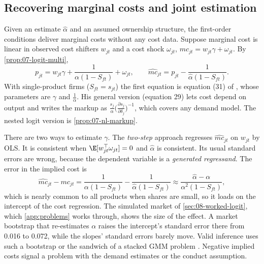\subsection{Recovering marginal costs and joint estimation}\label{sec:07-cost-recovery}

Given an estimate $\hat\alpha$ and an assumed ownership structure, the first-order conditions deliver marginal costs
without any cost data. Suppose marginal cost is linear in observed cost shifters $w_{jt}$ and a cost shock
$\omega_{jt}$, $mc_{jt} = w_{jt}\gamma + \omega_{jt}$. By \cref{prop:07-logit-multi},
\begin{equation}\label{eq:07-logit-supply}
  p_{jt} = w_{jt}\gamma + \frac{1}{\alpha(1 - S_{ft})} + \omega_{jt},
  \qquad \widehat{mc}_{jt} = p_{jt} - \frac{1}{\hat\alpha(1 - S_{ft})} .
\end{equation}
With single-product firms ($S_{ft} = s_{jt}$) the first equation is equation (31) of \citet[p.~255]{Berry1994},
whose parameters are $\gamma$ and $\frac{1}{\alpha}$. His general version (equation 29) lets cost depend on output and
writes the markup as $\frac{s_j}{\alpha}\bigl(\frac{\partial s_j}{\partial\delta_j}\bigr)^{-1}$, which covers any demand
model. The
nested logit version is \cref{prop:07-nl-markup}.

There are two ways to estimate $\gamma$. The \emph{two-step} approach regresses $\widehat{mc}_{jt}$ on $w_{jt}$ by
OLS. It is consistent when $\E[w_{jt}^\top\omega_{jt}] = 0$ and $\hat\alpha$ is consistent. Its usual standard errors
are wrong, because the dependent variable is a \emph{generated regressand}. The error in the implied cost is
\begin{equation*}
  \widehat{mc}_{jt} - mc_{jt} = \frac{1}{\alpha(1 - S_{ft})} - \frac{1}{\hat\alpha(1 - S_{ft})} \approx
  \frac{\hat\alpha - \alpha}{\alpha^2(1 - S_{ft})} ,
\end{equation*}
which is nearly common to all products when shares are small, so it loads on the intercept of the cost regression.
The simulated market of \cref{sec:08-worked-logit}, which \cref{app:problems} works through, shows the size of the
effect. A market bootstrap that re-estimates $\alpha$ raises the intercept's standard error there from 0.016 to 0.072,
while the slopes' standard errors barely move. Valid inference uses
such a bootstrap or the sandwich of a stacked GMM problem \citep{Newey1984}. Negative implied costs signal a problem
with the demand estimates or the conduct assumption.

